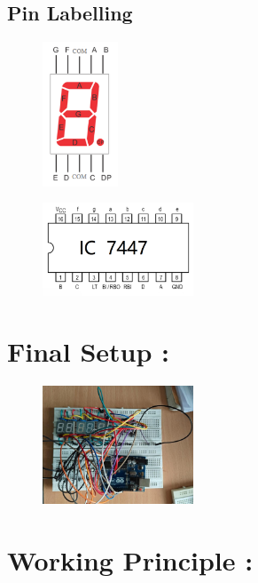 \documentclass[12pt]{article}
\begin{document}
	\subsection{Pin Labelling}
	\begin{figure}[h]
		\centering
		\includegraphics[width=0.2\textwidth]{figs/ssd.png}
	\end{figure}
	\begin{figure}[h]
		\centering
		\includegraphics[width=0.4\textwidth]{figs/7447.png}
	\end{figure}
	\newpage
	\section{Final Setup : }
	\begin{figure}[h]
		\centering
		\includegraphics[width=0.4\textwidth]{figs/setup.png}
	\end{figure}
	\newpage
	\section{Working Principle : }
\end{document}
